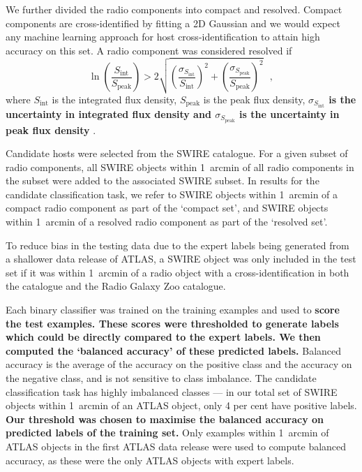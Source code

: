 \documentclass[fleqn,usenatbib,usedcolumn]{mnras}
\newcommand{\edited}[1]{{\bf {#1}}}
\begin{document}
    We further divided the radio components into compact and resolved. Compact
    components are cross-identified by fitting a 2D Gaussian \citep[as
    in][]{norris06} and we would expect any machine learning approach for host
    cross-identification to attain high accuracy on this set. A radio component was
    considered resolved if
    \begin{equation}
      \label{eq:compact}
        \ln \left(
          \frac{S_{\text{int}}}
               {S_{\text{peak}}}
        \right) > 2\sqrt{\left(
          \frac{\sigma_{S_{\text{int}}}}
               {S_{\text{int}}}
        \right)^2 + \left(
          \frac{\sigma_{S_{\text{peak}}}}
               {S_{\text{peak}}}
        \right)^2}\,\,\,\,,
    \end{equation}%
    where \(S_{\text{int}}\) is the integrated flux density,
    \(S_{\text{peak}}\) is the peak flux density, \edited{$\sigma_{S_{\text{int}}}$ is
    the uncertainty in integrated flux density and $\sigma_{S_{\text{peak}}}$
    is the uncertainty in peak flux density} \citep[following][]{franzen15}.

    Candidate hosts were selected from the SWIRE catalogue. For a given subset
    of radio components, all SWIRE objects within 1~arcmin of all radio
    components in the subset were added to the associated SWIRE subset. In results
    for the candidate classification task, we refer to SWIRE objects
    within 1~arcmin of a compact radio component as part of the `compact set',
    and SWIRE objects within 1~arcmin of a resolved radio component as part of
    the `resolved set'.

    To reduce bias in the testing data due to the expert labels being
    generated from a shallower data release of ATLAS, a SWIRE object was only
    included in the test set if it was within 1~arcmin of a radio object with
    a cross-identification in both the \citet{norris06} catalogue and the
    Radio Galaxy Zoo catalogue.

    Each binary classifier was trained on the training examples and used to
    \edited{score the test examples. These scores were thresholded to generate labels which could be directly compared
    to the expert labels. We then computed the `balanced accuracy' of these predicted labels.} Balanced
    accuracy is the average of the accuracy on the positive class and the
    accuracy on the negative class, and is not sensitive to class imbalance.
    The candidate classification task has highly imbalanced classes --- in our
    total set of SWIRE objects within 1~arcmin of an ATLAS object, only 4 per
    cent have positive labels. \edited{Our threshold was chosen to maximise the balanced
    accuracy on predicted labels of the training set.} Only examples within 1~arcmin of ATLAS objects
    in the first ATLAS data release \citep{norris06} were used to compute
    balanced accuracy, as these were the only ATLAS objects with expert labels.
\end{document}
